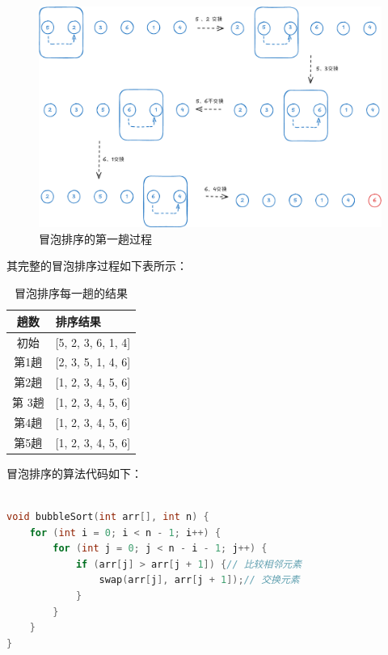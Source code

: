 \documentclass[lang=cn,newtx,10pt,scheme=chinese]{elegantbook}
\begin{document}
\begin{figure}[h!]
    \centering
    \includegraphics[width=1\textwidth]{./figure/pdf/cropped/bubbleSort.pdf}
    \caption{冒泡排序的第一趟过程}
    \label{fig:bubbleSort}
\end{figure}

其完整的冒泡排序过程如下表所示：
\begin{table}[h!]
\centering
\caption{冒泡排序每一趟的结果}

\label{tab:bubbleSort}

\begin{tabular}{|c|l|}
\hline
\textbf{趟数} & \textbf{排序结果} \\ \hline

初始 & [5, 2, 3, 6, 1, 4] \\ \hline

第1趟 & [2, 3, 5, 1, 4, 6] \\ \hline

第2趟 & [1, 2, 3, 4, 5, 6] \\ \hline

第 3趟 & [1, 2, 3, 4, 5, 6] \\ \hline

第4趟 & [1, 2, 3, 4, 5, 6] \\ \hline

第5趟 & [1, 2, 3, 4, 5, 6] \\ \hline
\end{tabular}

\end{table}

冒泡排序的算法代码如下：

\begin{lstlisting}[language=C++, caption=冒泡排序的算法代码]

void bubbleSort(int arr[], int n) {
    for (int i = 0; i < n - 1; i++) {
        for (int j = 0; j < n - i - 1; j++) {
            if (arr[j] > arr[j + 1]) {// 比较相邻元素
                swap(arr[j], arr[j + 1]);// 交换元素
            }
        }
    }
}

\end{lstlisting}
\end{document}
